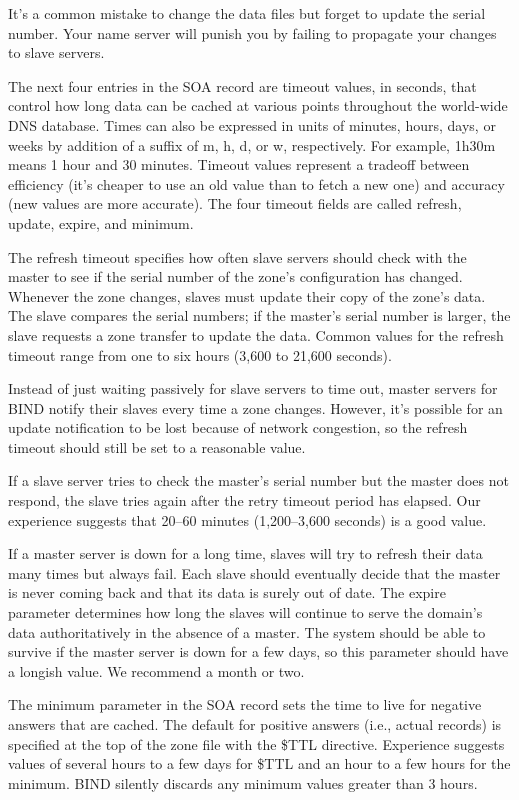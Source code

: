 It's a common mistake to change the data files but forget to update the
serial number. Your name server will punish you by failing to propagate
your changes to slave servers.

The next four entries in the SOA record are timeout values, in seconds,
that control how long data can be cached at various points throughout
the world-wide DNS database. Times can also be expressed in units of
minutes, hours, days, or weeks by addition of a suffix of {m}, {h}, {d},
or {w}, respectively. For example, {1h30m} means 1 hour and 30 minutes.
Timeout values represent a tradeoff between efficiency (it's cheaper to
use an old value than to fetch a new one) and accuracy (new values are
more accurate). The four timeout fields are called {refresh}, {update},
{expire}, and {minimum}.

The {refresh} timeout specifies how often slave servers should check
with the master to see if the serial number of the zone's configuration
has changed. Whenever the zone changes, slaves must update their copy of
the zone's data. The slave compares the serial numbers; if the master's
serial number is larger, the slave requests a zone transfer to update
the data. Common values for the {refresh} timeout range from one to six
hours (3,600 to 21,600 seconds).

Instead of just waiting passively for slave servers to time out, master
servers for BIND notify their slaves every time a zone changes. However,
it's possible for an update notification to be lost because of network
congestion, so the refresh timeout should still be set to a reasonable
value.

If a slave server tries to check the master's serial number but the
master does not respond, the slave tries again after the {retry} timeout
period has elapsed. Our experience suggests that 20--60 minutes
(1,200--3,600 seconds) is a good value.

If a master server is down for a long time, slaves will try to refresh
their data many times but always fail. Each slave should eventually
decide that the master is never coming back and that its data is surely
out of date. The {expire} parameter determines how long the slaves will
continue to serve the domain's data authoritatively in the absence of a
master. The system should be able to survive if the master server is
down for a few days, so this parameter should have a longish value. We
recommend a month or two.

The {minimum} parameter in the SOA record sets the time to live for
negative answers that are cached. The default for positive answers
(i.e., actual records) is specified at the top of the zone file with the
{\$TTL} directive. Experience suggests values of several hours to a few
days for {\$TTL} and an hour to a few hours for the {minimum}. BIND
silently discards any {minimum} values greater than 3 hours.

